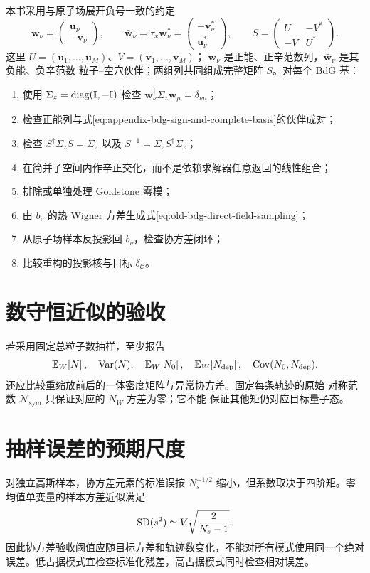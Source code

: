 本书采用与原子场展开负号一致的约定
\begin{equation}
  \bm w_\nu=\begin{pmatrix}\bm u_\nu\\-\bm v_\nu\end{pmatrix},
  \qquad
  \bar{\bm w}_\nu=\tau_x\bm w_\nu^*
  =\begin{pmatrix}-\bm v_\nu^*\\\bm u_\nu^*\end{pmatrix},
  \qquad
  S=\begin{pmatrix}U&-V^*\\-V&U^*\end{pmatrix}.
  \label{eq:appendix-bdg-sign-and-complete-basis}
\end{equation}
这里 $U=(\bm u_1,\ldots,\bm u_M)$、$V=(\bm v_1,\ldots,\bm v_M)$；
$\bm w_\nu$ 是正能、正辛范数列，$\bar{\bm w}_\nu$ 是其负能、负辛范数
粒子--空穴伙伴；两组列共同组成完整矩阵 $S$。对每个 BdG 基：
\begin{enumerate}
  \item 使用 $\Sigma_z=\operatorname{diag}(\mathbb{I},-\mathbb{I})$ 检查
  $\bm w_\nu^\dagger\Sigma_z\bm w_\mu=\delta_{\nu\mu}$；
  \item 检查正能列与式\eqref{eq:appendix-bdg-sign-and-complete-basis}的伙伴成对；
  \item 检查 $S^\dagger\Sigma_zS=\Sigma_z$ 以及
  $S^{-1}=\Sigma_zS^\dagger\Sigma_z$；
  \item 在简并子空间内作辛正交化，而不是依赖求解器任意返回的线性组合；
  \item 排除或单独处理 Goldstone 零模；
  \item 由 $b_\nu$ 的热 Wigner 方差生成式\eqref{eq:old-bdg-direct-field-sampling}；
  \item 从原子场样本反投影回 $b_\nu$，检查协方差闭环；
  \item 比较重构的投影核与目标 $\delta_{\mathcal C}$。
\end{enumerate}

\section{数守恒近似的验收}

若采用固定总粒子数抽样，至少报告
\begin{equation}
  \mathbb{E}_{W}\!\left[N\right],\quad \operatorname{Var}(N),\quad
  \mathbb{E}_{W}\!\left[N_0\right],\quad \mathbb{E}_{W}\!\left[N_{\rm dep}\right],\quad
  \operatorname{Cov}(N_0,N_{\rm dep}).
\end{equation}
还应比较重缩放前后的一体密度矩阵与异常协方差。固定每条轨迹的原始
对称范数 $\mathcal N_{\mathrm{sym}}$ 只保证对应的 $N_W$ 方差为零；它不能
保证其他矩仍对应目标量子态。

\section{抽样误差的预期尺度}

对独立高斯样本，协方差元素的标准误按 $N_s^{-1/2}$ 缩小，但系数取决于四阶矩。零均值单变量的样本方差近似满足
\begin{equation}
  {\rm SD}(s^2)\simeq V\sqrt{\frac{2}{N_s-1}}.
\end{equation}
因此协方差验收阈值应随目标方差和轨迹数变化，不能对所有模式使用同一个绝对误差。低占据模式宜检查标准化残差，高占据模式同时检查相对误差。
